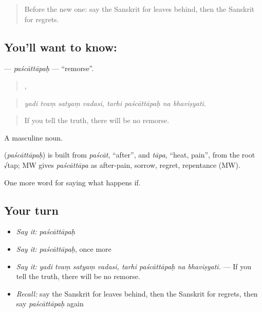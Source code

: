 \label{lesson:SA-C551-pascattapah}



\begin{quote}
Before the new one: say the Sanskrit for leaves behind, then the Sanskrit for regrets.
\end{quote}

\subsection*{You'll want to know: }
\textbf{} — \emph{paścāttāpaḥ} — \textquotedblleft{}remorse\textquotedblright{}.

\begin{quote}
   ,    
\end{quote}

\begin{quote}
\emph{yadi tvaṃ satyaṃ vadasi, tarhi paścāttāpaḥ na bhaviṣyati.}
\end{quote}

\begin{quote}
If you tell the truth, there will be no remorse.
\end{quote}

A masculine noun.

\begin{cousinweb}
\textbf{} (\emph{paścāttāpaḥ}) is built from \emph{paścāt}, \textquotedblleft{}after\textquotedblright{}, and \emph{tāpa}, \textquotedblleft{}heat, pain\textquotedblright{}, from the root √tap; MW gives \emph{paścāttāpa} as after-pain, sorrow, regret, repentance (MW).
\end{cousinweb}

\begin{grammarlens}[title={What you've built}]
One more word for saying what happens if.
\end{grammarlens}

\subsection*{Your turn}
\begin{itemize}
\raggedright
  \item \emph{Say it:} \emph{paścāttāpaḥ}
  \item \emph{Say it:} \emph{paścāttāpaḥ}, once more
  \item \emph{Say it:} \emph{yadi tvaṃ satyaṃ vadasi, tarhi paścāttāpaḥ na bhaviṣyati.} — If you tell the truth, there will be no remorse.
  \item \emph{Recall:} say the Sanskrit for leaves behind, then the Sanskrit for regrets, then say \emph{paścāttāpaḥ} again
\end{itemize}

